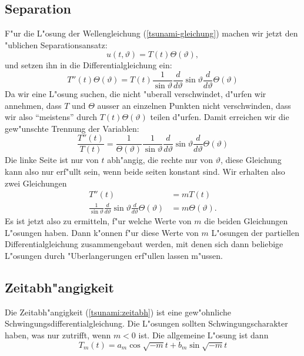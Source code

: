 \subsection{Separation}
F"ur die L"osung der Wellengleichung (\ref{tsunami-gleichung}) machen
wir jetzt den "ublichen Separationsansatz:
\[
u(t,\vartheta)=T(t)\Theta(\vartheta),
\]
und setzen ihn in die Differentialgleichung ein:
\[
T''(t)\Theta(\vartheta)=
T(t)
\frac1{\sin\vartheta}
\frac{d}{d\vartheta}
\sin\vartheta
\frac{d}{d\vartheta}\Theta(\vartheta)
\]
Da wir eine L"osung suchen, die nicht "uberall verschwindet,
d"urfen wir annehmen, dass $T$ und $\Theta$ ausser an einzelnen
Punkten nicht verschwinden, dass wir also ``meistens'' durch
$T(t)\Theta(\vartheta)$ teilen d"urfen. Damit erreichen wir
die gew"unschte Trennung der Variablen:
\begin{equation}
\frac{T''(t)}{T(t)}
=
\frac1{\Theta(\vartheta)}
\frac1{\sin\vartheta}
\frac{d}{d\vartheta}
\sin\vartheta
\frac{d}{d\vartheta}\Theta(\vartheta)
\label{tsunami-separiert}
\end{equation}
Die linke Seite ist nur von $t$ abh"angig, die rechte nur von $\vartheta$,
diese Gleichung kann also nur erf"ullt sein, wenn beide seiten konstant
sind.  Wir erhalten also zwei Gleichungen
\begin{align}
T''(t)&=mT(t)
\label{tsunami:zeitabh}
\\
\frac1{\sin\vartheta}
\frac{d}{d\vartheta}
\sin\vartheta
\frac{d}{d\vartheta}\Theta(\vartheta)
&=m\Theta(\vartheta).
\label{tsunami:winkelabh}
\end{align}
Es ist jetzt also zu ermitteln, f"ur welche Werte von $m$ die beiden
Gleichungen L"osungen haben. Dann k"onnen f"ur diese Werte von $m$ 
L"osungen der partiellen Differentialgleichung zusammengebaut werden,
mit denen sich dann beliebige L"osungen durch "Uberlangerungen
erf"ullen lassen m"ussen.

\subsection{Zeitabh"angigkeit}
Die Zeitabh"angigkeit (\ref{tsunami:zeitabh}) ist eine gew"ohnliche
Schwingungsdifferentialgleichung.
Die L"osungen sollten Schwingungscharakter haben, was nur zutrifft, wenn
$m<0$ ist. Die allgemeine L"osung ist dann
\[
T_m(t)=a_m\cos\sqrt{-m}t+b_m\sin\sqrt{-m}t
\]

